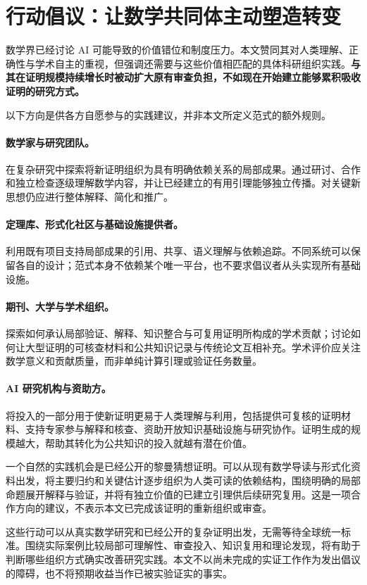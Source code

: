 \documentclass[UTF8,11pt,a4paper,fontset=fandol]{ctexart}
\theoremstyle{definition}\newtheorem{definition}{定义}
\begin{document}
\section{行动倡议：让数学共同体主动塑造转变}
数学界已经讨论 AI 可能导致的价值错位和制度压力。本文赞同其对人类理解、正确性与学术自主的重视，但强调还需要与这些价值相匹配的具体科研组织实践。\textbf{与其在证明规模持续增长时被动扩大原有审查负担，不如现在开始建立能够累积吸收证明的研究方式。}

以下方向是供各方自愿参与的实践建议，并非本文所定义范式的额外规则。

\paragraph{数学家与研究团队。} 在复杂研究中探索将新证明组织为具有明确依赖关系的局部成果。通过研讨、合作和独立检查逐级理解数学内容，并让已经建立的有用引理能够独立传播。对关键新思想仍应进行整体解释、简化和推广。

\paragraph{定理库、形式化社区与基础设施提供者。} 利用既有项目支持局部成果的引用、共享、语义理解与依赖追踪。不同系统可以保留各自的设计；范式本身不依赖某个唯一平台，也不要求倡议者从头实现所有基础设施。

\paragraph{期刊、大学与学术组织。} 探索如何承认局部验证、解释、知识整合与可复用证明所构成的学术贡献；讨论如何让大型证明的可核查材料和公共知识记录与传统论文互相补充。学术评价应关注数学意义和贡献质量，而非单纯计算引理或验证任务数量。

\paragraph{AI 研究机构与资助方。} 将投入的一部分用于使新证明更易于人类理解与利用，包括提供可复核的证明材料、支持专家参与解释和核查、资助开放知识基础设施与研究协作。证明生成的规模越大，帮助其转化为公共知识的投入就越有潜在价值。

一个自然的实践机会是已经公开的黎曼猜想证明。可以从现有数学导读与形式化资料出发，将主要归约和关键估计逐步组织为人类可读的依赖结构，围绕明确的局部命题展开解释与验证，并将有独立价值的已建立引理供后续研究复用。这是一项合作方向的建议，不表示本文已完成该证明的重新组织或审查。

这些行动可以从真实数学研究和已经公开的复杂证明出发，无需等待全球统一标准。围绕实际案例比较局部可理解性、审查投入、知识复用和理论发现，将有助于判断哪些组织方式确实改善研究实践。本文不以尚未完成的实证工作作为发出倡议的障碍，也不将预期收益当作已被实验证实的事实。
\end{document}
